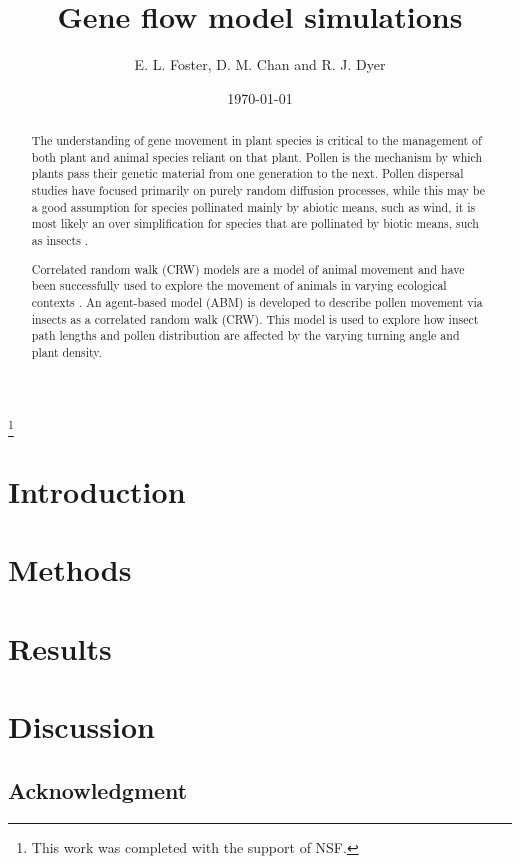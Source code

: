 \documentclass{article}
\begin{document}
\title{Gene flow model simulations}

\author{E. L. Foster, D. M. Chan and R. J. Dyer }



\thanks{This work was completed with the support of NSF.}


\date{\today}

\maketitle

\begin{abstract} 
  The understanding of gene movement in plant species is critical to the management
  of both plant and animal species reliant on that plant.  Pollen is the mechanism by which plants
  pass their genetic material from one generation to the next. Pollen dispersal studies have focused
  primarily on purely random diffusion processes, while this may be a good assumption for species
  pollinated mainly by abiotic means, such as wind, it is most likely an over simplification for
  species that are pollinated by biotic means, such as insects \cite{Chan}.

  Correlated random walk (CRW) models are a model of animal movement \cite{Prasad05} and have been
  successfully used to explore the movement of animals in varying ecological contexts
  \cite{Bartumeus07}. An agent-based model (ABM) is developed to describe pollen movement via insects
  as a correlated random walk (CRW). This model is used to explore how insect path lengths and pollen
  distribution are affected by the varying turning angle and plant density.  
\end{abstract}

\section{{\bf Introduction}}
  
\section{{\bf Methods}}
  
\section{{\bf Results}}
  
\section{{\bf Discussion}}
\subsection*{Acknowledgment}



\end{document}
